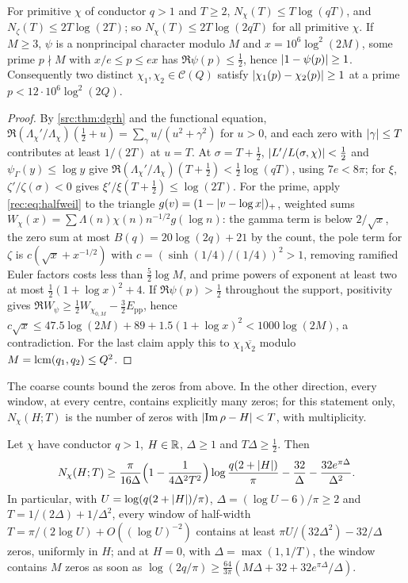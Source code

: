 \begin{lemma}\label{rec:lem:angular}
For primitive $\chi$ of conductor $q>1$ and $T\ge2$, $N_\chi(T)\le T\log(qT)$, and $N_\zeta(T)\le2T\log(2T)$; so
$N_\chi(T)\le2T\log(2qT)$ for all primitive $\chi$. If $M\ge3$, $\psi$ is a nonprincipal character modulo $M$ and
$x=10^6\log^2(2M)$, some prime $p\nmid M$ with $x/e\le p\le ex$ has $\Re\psi(p)\le\tfrac12$, hence
$\lvert1-\psi(p)\rvert\ge1$. Consequently two distinct $\chi_1,\chi_2\in\mathcal C(Q)$ satisfy $\lvert\chi_1(p)-\chi_2(p)\rvert\ge1$ at a
prime $p<12\cdot10^6\log^2(2Q)$.
\end{lemma}

\begin{proof}
By \cref{src:thm:dgrh} and the functional equation,
$\Re(\Lambda_\chi'/\Lambda_\chi)(\tfrac12+u)=\sum_\gamma u/(u^2+\gamma^2)$ for $u>0$, and each zero with $\lvert\gamma\rvert\le T$ contributes
at least $1/(2T)$ at $u=T$. At $\sigma=T+\tfrac12$, $\lvert L'/L(\sigma,\chi)\rvert<\tfrac12$ and $\psi_\Gamma(y)\le\log y$ give
$\Re(\Lambda_\chi'/\Lambda_\chi)(T+\tfrac12)<\tfrac12\log(qT)$, using $7e<8\pi$; for $\xi$, $\zeta'/\zeta(\sigma)<0$ gives
$\xi'/\xi(T+\tfrac12)\le\log(2T)$. For the prime, apply \eqref{rec:eq:halfweil} to the triangle
$g(v)=(1-\lvert v-\log x\rvert)_+$, weighted sums $W_\chi(x)=\sum\Lambda(n)\chi(n)n^{-1/2}g(\log n)$: the gamma term is below
$2/\sqrt x$, the zero sum at most $B(q)=20\log(2q)+21$ by the count, the pole term for $\zeta$ is
$c(\sqrt x+x^{-1/2})$ with $c=(\sinh(1/4)/(1/4))^2>1$, removing ramified Euler factors costs less than
$\tfrac52\log M$, and prime powers of exponent at least two at most $\tfrac12(1+\log x)^2+4$. If
$\Re\psi(p)>\tfrac12$ throughout the support, positivity gives $\Re W_\psi\ge\tfrac12W_{\chi_{0,M}}-\tfrac32E_{\mathrm{pp}}$, hence
$c\sqrt x\le47.5\log(2M)+89+1.5(1+\log x)^2<1000\log(2M)$, a contradiction. For the last claim apply this
to $\chi_1\overline{\chi_2}$ modulo $M=\operatorname{lcm}(q_1,q_2)\le Q^2$.
\end{proof}

The coarse counts bound the zeros from above. In the other direction, every window, at every centre,
contains explicitly many zeros; for this statement only, $N_\chi(H;T)$ is the number of zeros with $\lvert\operatorname{Im}\rho-H\rvert<T$, with
multiplicity.

\begin{proposition}\label{rec:prop:movingwin}
Let $\chi$ have conductor $q>1$, $H\in\mathbb{R}$, $\Delta\ge1$ and $T\Delta\ge\tfrac12$. Then
\[
 N_\chi(H;T)\ge\frac\pi{16\Delta}\Bigl(1-\frac1{4\Delta^2T^2}\Bigr)\log\frac{q(2+\lvert H\rvert)}\pi-\frac{32}\Delta-\frac{32e^{\pi\Delta}}{\Delta^2}.
\]
In particular, with $U=\log(q(2+\lvert H\rvert)/\pi)$, $\Delta=(\log U-6)/\pi\ge2$ and $T=1/(2\Delta)+1/\Delta^2$, every window of half-width
$T=\pi/(2\log U)+O((\log U)^{-2})$ contains at least $\pi U/(32\Delta^2)-32/\Delta$ zeros, uniformly in $H$; and at $H=0$, with
$\Delta=\max(1,1/T)$, the window contains $M$ zeros as soon as $\log(2q/\pi)\ge\frac{64}{3\pi}(M\Delta+32+32e^{\pi\Delta}/\Delta)$.
\end{proposition}

